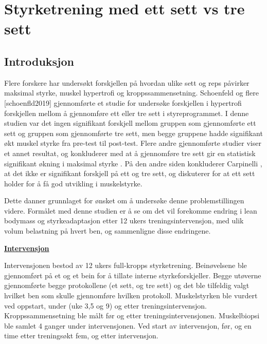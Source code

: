 \documentclass[
]{book}
\begin{document}
\hypertarget{styrketrening-med-ett-sett-vs-tre-sett}{%
\chapter{Styrketrening med ett sett vs tre sett}\label{styrketrening-med-ett-sett-vs-tre-sett}}

\hypertarget{introduksjon-1}{%
\section{Introduksjon}\label{introduksjon-1}}

Flere forskere har undersøkt forskjellen på hvordan ulike sett og reps påvirker maksimal styrke, muskel hypertrofi og kroppssammensetning. Schoenfeld og flere {[}schoenfld2019{]} gjennomførte et studie for undersøke forskjellen i hypertrofi forskjellen mellom å gjennomføre ett eller tre sett i styreprogrammet. I denne studien var det ingen signifikant forskjell mellom gruppen som gjennomførte ett sett og gruppen som gjennomførte tre sett, men begge gruppene hadde signifikant økt muskel styrke fra pre-test til post-test. Flere andre gjennomførte studier viser et annet resultat, og konkluderer med at å gjennomføre tre sett gir en statistisk signifikant økning i maksimal styrke \citep{rhea2002, munn2005, fröhlich2010}. På den andre siden konkluderer Carpinelli \citep{carpinelli1998}, at det ikke er signifikant forskjell på ett og tre sett, og diskuterer for at ett sett holder for å få god utvikling i muskelstyrke.

Dette danner grunnlaget for ønsket om å undersøke denne problemstillingen videre. Formålet med denne studien er å se om det vil forekomme endring i lean bodymass og styrkeadaptasjon etter 12 ukers treningsintervensjon, med ulik volum belastning på hvert ben, og sammenligne disse endringene.

\underline{\textbf{Intervensjon}}

Intervensjonen bestod av 12 ukers full-kropps styrketrening. Beinøvelsene ble gjennomført på et og et bein for å tillate interne styrkeforskjeller. Begge utøverne gjennomførte begge protokollene (et sett, og tre sett) og det ble tilfeldig valgt hvilket ben som skulle gjennomføre hvilken protokoll. Muskelstyrken ble vurdert ved oppstart, under (uke 3,5 og 9) og etter treningsintervensjon. Kroppssammensetning ble målt før og etter treningsintervensjonen. Muskelbiopsi ble samlet 4 ganger under intervensjonen. Ved start av intervensjon, før, og en time etter treningsøkt fem, og etter intervensjon.
\end{document}

